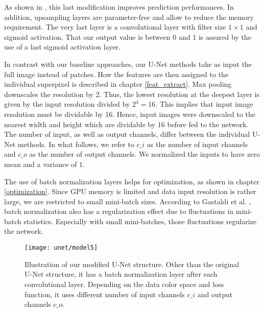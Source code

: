 As shown in \cite{vorontsov17}, this last modification improves prediction performances.  In addition, upsampling layers are parameter-free and allow to reduce the memory requirement. The very last layer is a convolutional layer with filter size $1 \times 1$ and sigmoid activation. That our output value is between $0$ and $1$ is assured by the use of a last sigmoid activation layer.

In contrast with our baseline approaches, our U-Net methods take as input the full image instead of patches.
How the features are then assigned to the individual superpixel is described in chapter \ref{feat_extract}.
Max pooling downscales the resolution by $2$. Thus, the lowest resolution at the deepest layer is given by the input resolution divided by $2^4=16$. This implies that input image resolution must be dividable by 16. Hence, input images were downscaled to the nearest width and height which are dividable by $16$ before fed to the network. The number of input, as well as output channels, differ between the individual U-Net methods. In what follows, we refer to $c\_i$ as the number of input channels and $c\_o$ as the number of output channels. We normalized the inputs to have zero mean and a variance of $1$.

The use of batch normalization layers helps for optimization, as shown in chapter \ref{optimization}.
Since GPU memory is limited and data input resolution is rather large, we are restricted to small mini-batch sizes.
According to Gastaldi et al. \cite{gastaldi17}, batch normalization also has a regularization effect due to fluctuations in mini-batch statistics. Especially with small mini-batches, those fluctuations regularize the network.

\clearpage
\begin{figure}[!htbp]
  \centering
  \texttt{[image: unet/model5]}
  \caption[Modified U-Net architecture]{Illustration of our modified U-Net structure. Other than the original U-Net structure, it has a batch normalization layer after each convolutional layer. Depending on the data color space and loss function, it uses different number of input channels $c\_i$ and output channels $c\_o$.}
  \label{fig:unet_model}
\end{figure}

